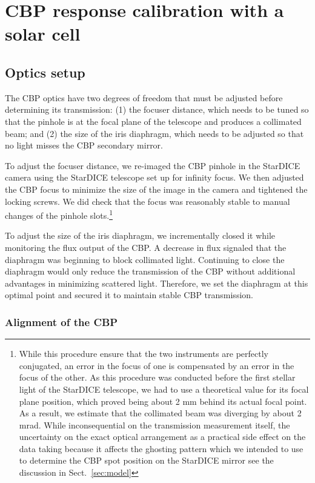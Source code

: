 \section{CBP response calibration with a solar cell}
\label{sec:rcbp}

\subsection{Optics setup}

The CBP optics have two degrees of freedom that must be adjusted
before determining its transmission: (1) the focuser distance, which
needs to be tuned so that the pinhole is at the focal plane of the
telescope and produces a collimated beam; and (2) the size of the iris
diaphragm, which needs to be adjusted so that no light misses the CBP
secondary mirror.

To adjust the focuser distance, we re-imaged the CBP pinhole in the
StarDICE camera using the StarDICE telescope set up for infinity
focus. We then adjusted the CBP focus to minimize the size of the
image in the camera and tightened the locking screws. We did check
that the focus was reasonably stable to manual changes of the pinhole
slots.\footnote{While this procedure ensure that the two instruments
  are perfectly conjugated, an error in the focus of one is
  compensated by an error in the focus of the other. As this procedure
  was conducted before the first stellar light of the StarDICE
  telescope, we had to use a theoretical value for its focal plane
  position, which proved being about 2 mm behind its actual focal
  point. As a result, we estimate that the collimated beam was
  diverging by about 2 mrad. While inconsequential on the transmission
  measurement itself, the uncertainty on the exact optical arrangement
  as a practical side effect on the data taking because it affects the
  ghosting pattern which we intended to use to determine the CBP spot
  position on the StarDICE mirror see the discussion in Sect.~\ref{sec:model}}

To adjust the size of the iris diaphragm, we incrementally closed it
while monitoring the flux output of the CBP. A decrease in flux
signaled that the diaphragm was beginning to block collimated
light. Continuing to close the diaphragm would only reduce the
transmission of the CBP without additional advantages in minimizing
scattered light. Therefore, we set the diaphragm at this optimal point
and secured it to maintain stable CBP transmission.

\subsubsection{Alignment of the CBP}

